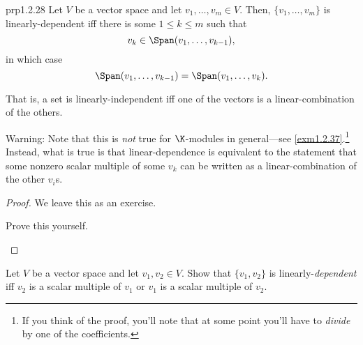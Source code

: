 \begin{prp}{}{prp1.2.28}
	Let $V$ be a vector space and let $v_1,\ldots ,v_m\in V$.  Then, $\{ v_1,\ldots ,v_m\}$ is linearly-dependent iff there is some $1\leq k\leq m$ such that
	\begin{equation}
		v_k\in \Span (v_1,\ldots ,v_{k-1}),
	\end{equation}
	in which case
	\begin{equation}
		\Span (v_1,\ldots ,v_{k-1})=\Span (v_1,\ldots ,v_k).
	\end{equation}
	\begin{rmk}
		That is, a set is linearly-independent iff one of the vectors is a linear-combination of the others.
	\end{rmk}
	\begin{rmk}
		Warning:  Note that this is \emph{not} true for $\K$-modules in general---see \cref{exm1.2.37}.\footnote{If you think of the proof, you'll note that at some point you'll have to \emph{divide} by one of the coefficients.}  Instead, what is true is that linear-dependence is equivalent to the statement that some nonzero scalar multiple of some $v_k$ can be written as a linear-combination of the other $v_i$s.
	\end{rmk}
	\begin{proof}
		We leave this as an exercise.
		\begin{exr}[breakable=false]{}{}
			Prove this yourself.
		\end{exr}
	\end{proof}
\end{prp}
\begin{exr}{}{}
	Let $V$ be a vector space and let $v_1,v_2\in V$.  Show that $\{ v_1,v_2\}$ is linearly-\emph{dependent} iff $v_2$ is a scalar multiple of $v_1$ or $v_1$ is a scalar multiple of $v_2$.
\end{exr}
